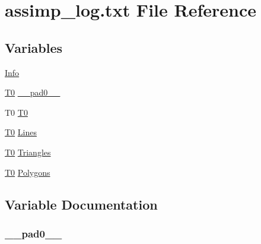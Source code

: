 \hypertarget{assimp__log_8txt}{}\section{assimp\+\_\+log.\+txt File Reference}
\label{assimp__log_8txt}
\subsection*{Variables}
\begin{DoxyCompactItemize}
\item 
\hyperlink{assimp__log_8txt_a10e136332d6dc091c13986d59367f7a1}{Info}
\item 
\hyperlink{assimp__log_8txt_a4f6b0da32d987d712f99f108a27b44ff}{T0} \hyperlink{assimp__log_8txt_acdfe4734f16c9d3b3fc5affb4fefed6e}{\+\_\+\+\_\+pad0\+\_\+\+\_\+}
\item 
T0 \hyperlink{assimp__log_8txt_a4f6b0da32d987d712f99f108a27b44ff}{T0}
\item 
\hyperlink{assimp__log_8txt_a4f6b0da32d987d712f99f108a27b44ff}{T0} \hyperlink{assimp__log_8txt_a45fe61d4047cde49c4946edc0d1ac62e}{Lines}
\item 
\hyperlink{assimp__log_8txt_a4f6b0da32d987d712f99f108a27b44ff}{T0} \hyperlink{assimp__log_8txt_a11eaa1907dff68316087b51244ae7d9f}{Triangles}
\item 
\hyperlink{assimp__log_8txt_a4f6b0da32d987d712f99f108a27b44ff}{T0} \hyperlink{assimp__log_8txt_afa6022965f219ff3e1a1319e791de3a4}{Polygons}
\end{DoxyCompactItemize}


\subsection{Variable Documentation}
\subsubsection[{\texorpdfstring{\+\_\+\+\_\+pad0\+\_\+\+\_\+}{__pad0__}}]{ \+\_\+\+\_\+pad0\+\_\+\+\_\+}\hypertarget{assimp__log_8txt_acdfe4734f16c9d3b3fc5affb4fefed6e}{}\label{assimp__log_8txt_acdfe4734f16c9d3b3fc5affb4fefed6e}
